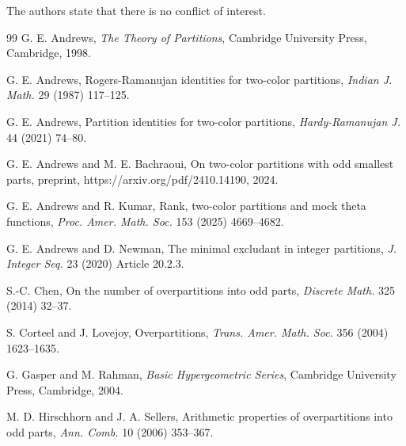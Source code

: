 \documentclass{amsart}
\numberwithin{equation}{section}
\theoremstyle{definition}
\begin{document}
\medskip
{} The authors state that there is no conflict of interest.

\begin{thebibliography}{99}
G. E. Andrews, {\it The Theory of Partitions}, Cambridge University Press, Cambridge, 1998.

G. E. Andrews, Rogers-Ramanujan identities for two-color partitions, {\it Indian J. Math.} 29 (1987) 117--125.

G. E. Andrews, Partition identities for two-color partitions, {\it Hardy-Ramanujan J.} 44 (2021) 74--80.

G. E. Andrews and M. E. Bachraoui, On two-color partitions with odd smallest parts, preprint, https://arxiv.org/pdf/2410.14190, 2024.

G. E. Andrews and R. Kumar, Rank, two-color partitions and mock theta functions, {\it Proc. Amer. Math. Soc.} 153 (2025) 4669--4682.

G. E. Andrews and D. Newman, The minimal excludant in integer partitions, {\it J. Integer Seq.} 23 (2020) Article 20.2.3.

S.-C. Chen, On the number of overpartitions into odd parts, {\it Discrete Math.} 325 (2014) 32--37.

S. Corteel and J. Lovejoy, Overpartitions, {\it Trans. Amer. Math. Soc.} 356 (2004) 1623--1635.

G. Gasper and M. Rahman, {\it Basic Hypergeometric Series}, Cambridge University Press, Cambridge, 2004.

M. D. Hirschhorn and J. A. Sellers, Arithmetic properties of overpartitions into odd parts, {\it Ann. Comb.} 10 (2006) 353--367.
\end{thebibliography}
\end{document}

